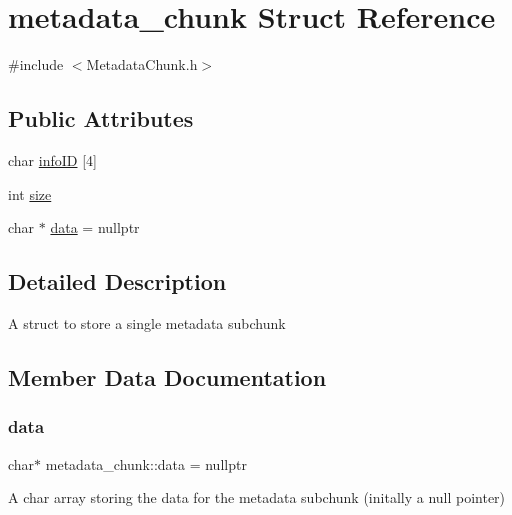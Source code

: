 \hypertarget{structmetadata__chunk}{}\section{metadata\+\_\+chunk Struct Reference}
\label{structmetadata__chunk}


{\ttfamily \#include $<$Metadata\+Chunk.\+h$>$}

\subsection*{Public Attributes}
\begin{DoxyCompactItemize}
\item 
char \hyperlink{structmetadata__chunk_abbaaa4b4eacd8fb2816105b5994d403c}{info\+ID} \mbox{[}4\mbox{]}
\item 
int \hyperlink{structmetadata__chunk_ab35474f8e23bc06b567838a1d1394445}{size}
\item 
char $\ast$ \hyperlink{structmetadata__chunk_a6033d835b0300a9fbfa59bb59a9b8a20}{data} = nullptr
\end{DoxyCompactItemize}


\subsection{Detailed Description}
A struct to store a single metadata subchunk 

\subsection{Member Data Documentation}
\mbox{\label{structmetadata__chunk_a6033d835b0300a9fbfa59bb59a9b8a20}} 
\subsubsection{\texorpdfstring{data}{data}}
{\footnotesize\ttfamily char$\ast$ metadata\+\_\+chunk\+::data = nullptr}

A char array storing the data for the metadata subchunk (initally a null pointer) \mbox{\label{structmetadata__chunk_abbaaa4b4eacd8fb2816105b5994d403c}} 
